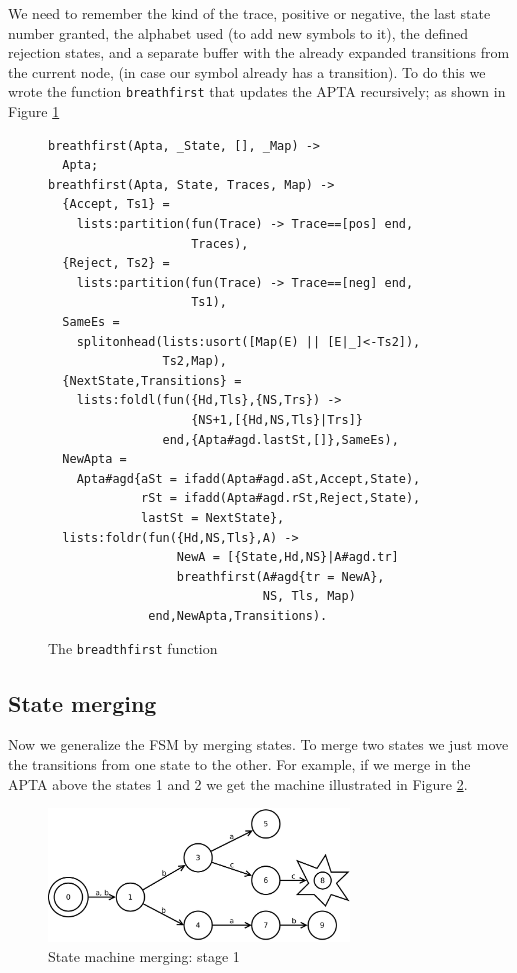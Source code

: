 \documentclass[]{sigplanconf}
\begin{document}
We need to  remember the kind of the trace, positive or negative, 
the last state number granted,
the alphabet used (to add new symbols to it), the defined
rejection states, and a separate buffer with the already expanded
transitions from the current node, (in case our symbol already
has a transition).
To do this we wrote the function \texttt{breathfirst} that
updates the APTA recursively; as shown in  Figure \ref{breadthfirst}
\begin{figure}
\begin{verbatim}
breathfirst(Apta, _State, [], _Map) ->
  Apta;
breathfirst(Apta, State, Traces, Map) ->
  {Accept, Ts1} = 
    lists:partition(fun(Trace) -> Trace==[pos] end, 
                    Traces),
  {Reject, Ts2} = 
    lists:partition(fun(Trace) -> Trace==[neg] end, 
                    Ts1),
  SameEs = 
    splitonhead(lists:usort([Map(E) || [E|_]<-Ts2]),
                Ts2,Map),
  {NextState,Transitions} =
    lists:foldl(fun({Hd,Tls},{NS,Trs}) ->
                    {NS+1,[{Hd,NS,Tls}|Trs]}
                end,{Apta#agd.lastSt,[]},SameEs),
  NewApta =
    Apta#agd{aSt = ifadd(Apta#agd.aSt,Accept,State),
             rSt = ifadd(Apta#agd.rSt,Reject,State),
             lastSt = NextState},
  lists:foldr(fun({Hd,NS,Tls},A) ->
                  NewA = [{State,Hd,NS}|A#agd.tr]
                  breathfirst(A#agd{tr = NewA},
                              NS, Tls, Map)
              end,NewApta,Transitions).
\end{verbatim}
\caption{The \texttt{breadthfirst} function}
\label{breadthfirst}
\end{figure}

\subsection{State merging}

Now we generalize the FSM by merging states. To merge two
states we just move the transitions from one state to the other.
For example, if we merge in the APTA above the states 1 and 2
we get the machine illustrated in Figure \ref{fsm2}.

\begin{figure}
\begin{center}
\includegraphics[width=8cm]{pictures/fsm2.pdf}
\end{center}
\caption{State machine merging: stage 1}
\label{fsm2}
\end{figure}
\end{document}
